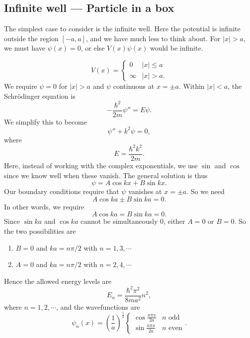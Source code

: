 \documentclass[a4paper]{article}
\begin{document}
\subsection{Infinite well --- Particle in a box}
The simplest case to consider is the infinite well. Here the potential is infinite outside the region $[-a, a]$, and we have much less to think about. For $|x| > a$, we must have $\psi(x) = 0$, or else $V(x) \psi(x)$ would be infinite.
\begin{center}
\end{center}
\[
  V(x) =
  \begin{cases}
    0 & |x| \leq a\\
    \infty & |x| > a.
  \end{cases}
\]
We require $\psi = 0$ for $|x| > a$ and $\psi$ continuous at $x = \pm a$. Within $|x| < a$, the Schr\"odinger equation is
\[
  -\frac{\hbar^2}{2m}\psi'' = E\psi.
\]
We simplify this to become
\[
  \psi'' + k^2 \psi = 0,
\]
where
\[
  E = \frac{\hbar^2 k^2}{2m}.
\]
Here, instead of working with the complex exponentials, we use $\sin$ and $\cos$ since we know well when these vanish. The general solution is thus
\[
  \psi = A\cos kx + B\sin kx.
\]
Our boundary conditions require that $\psi$ vanishes at $x = \pm a$. So we need
\[
  A \cos ka \pm B\sin ka = 0.
\]
In other words, we require
\[
  A\cos ka = B\sin ka = 0.
\]
Since $\sin ka$ and $\cos ka$ cannot be simultaneously $0$, either $A = 0$ or $B = 0$. So the two possibilities are
\begin{enumerate}
  \item $B = 0$ and $ka = n\pi/2$ with $n = 1, 3, \cdots$
  \item $A = 0$ and $ka = n\pi/2$ with $n = 2, 4, \cdots$
\end{enumerate}
Hence the allowed energy levels are
\[
  E_n = \frac{\hbar^2 \pi^2}{8ma^2} n^2,
\]
where $n = 1, 2, \cdots$, and the wavefunctions are
\[
  \psi_n(x) = \left(\frac{1}{a}\right)^{\frac{1}{2}}
  \begin{cases}
    \cos \frac{n\pi x}{2a} & n\text{ odd}\\
    \sin \frac{n\pi x}{2a} & n\text{ even}
  \end{cases}.
\]
\end{document}

